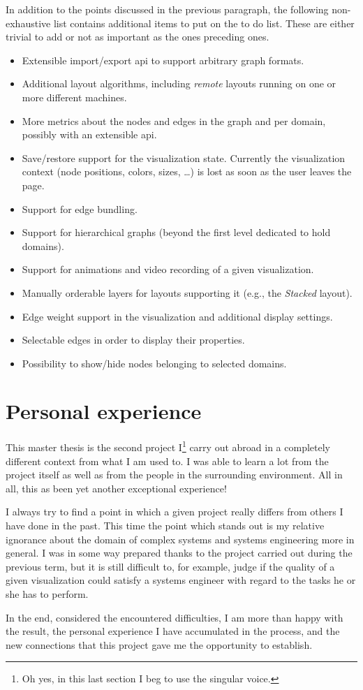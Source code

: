 In addition to the points discussed in the previous paragraph, the following non-exhaustive list contains additional items to put on the to do list. These are either trivial to add or not as important as the ones preceding ones.

\begin{itemize}[nolistsep]
  \item Extensible import/export \gls{api} to support arbitrary graph formats.
  \item Additional layout algorithms, including \emph{remote} layouts running on one or more different machines.
  \item More metrics about the nodes and edges in the graph and per domain, possibly with an extensible \gls{api}.
  \item Save/restore support for the visualization state. Currently the visualization context (node positions, colors, sizes, \ldots) is lost as soon as the user leaves the page.  
  \item Support for edge bundling.
  \item Support for hierarchical graphs (beyond the first level dedicated to hold domains).
  \item Support for animations and video recording of a given visualization.
  \item Manually orderable layers for layouts supporting it (e.g., the \emph{Stacked} layout).
  \item Edge weight support in the visualization and additional display settings.
  \item Selectable edges in order to display their properties.
  \item Possibility to show/hide nodes belonging to selected domains.
\end{itemize}

\section{Personal experience}
\label{sec:experience}

This master thesis is the second project I\footnote{Oh yes, in this last section I beg to use the singular voice.} carry out abroad in a completely different context from what I am used to. I was able to learn a lot from the project itself as well as from the people in the surrounding environment. All in all, this as been yet another exceptional experience!

I always try to find a point in which a given project really differs from others I have done in the past. This time the point which stands out is my relative ignorance about the domain of complex systems and systems engineering more in general. I was in some way prepared thanks to the project carried out during the previous term, but it is still difficult to, for example, judge if the quality of a given visualization could satisfy a systems engineer with regard to the tasks he or she has to perform.

In the end, considered the encountered difficulties, I am more than happy with the result, the personal experience I have accumulated in the process, and the new connections that this project gave me the opportunity to establish.

